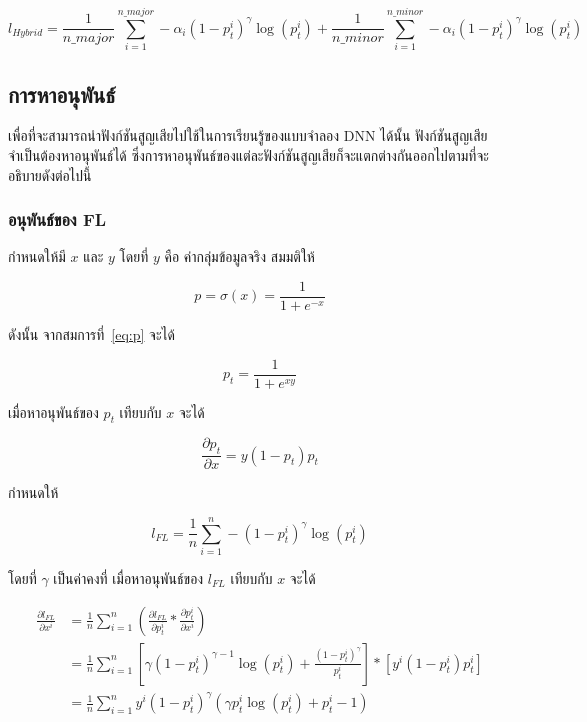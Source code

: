 \begin{equation} \label{eq:hybird1}
    l_{Hybrid} = \frac{1}{n\_major} \sum_{i = 1}^{n\_major} -\alpha_{i}(1 - p_{t}^{i})^{\gamma}\log (p_{t}^{i}) + \frac{1}{n\_minor} \sum_{i = 1}^{n\_minor} -\alpha_{i}(1 - p_{t}^{i})^{\gamma}\log (p_{t}^{i})
\end{equation}

\subsection{การหาอนุพันธ์}
เพื่อที่จะสามารถนำฟังก์ชันสูญเสียไปใช้ในการเรียนรู้ของแบบจำลอง DNN ได้นั้น ฟังก์ชันสูญเสียจำเป็นต้องหาอนุพันธ์ได้ ซึ่งการหาอนุพันธ์ของแต่ละฟังก์ชันสูญเสียก็จะแตกต่างกันออกไปตามที่จะอธิบายดังต่อไปนี้

\subsubsection{อนุพันธ์ของ FL}
กำหนดให้มี $x$ และ $y$ โดยที่ $y$ คือ ค่ากลุ่มข้อมูลจริง สมมติให้

\begin{equation}
	p = \sigma (x) = \frac{1}{1 + e^{-x}}
\end{equation}

ดังนั้น จากสมการที่~\ref{eq:p} จะได้

\begin{equation}
	p_{t} = \frac{1}{1 + e^{xy}}
\end{equation}

เมื่อหาอนุพันธ์ของ $p_{t}$ เทียบกับ $x$ จะได้

\begin{equation}
\frac{\partial p_{t}}{\partial x} = y(1 - p_{t})p_{t}
\end{equation}

กำหนดให้

\begin{equation}
    l_{FL} = \frac{1}{n} \sum_{i = 1}^{n} - (1 - p_{t}^{i})^{\gamma}\log (p_{t}^{i})
\end{equation}

โดยที่ $\gamma$ เป็นค่าคงที่ เมื่อหาอนุพันธ์ของ $l_{FL}$ เทียบกับ $x$ จะได้

\begin{equation}
\begin{split}
\frac{\partial l_{FL}}{\partial x^{i}} & = \frac{1}{n} \sum_{i = 1}^{n} (\frac{\partial l_{FL}}{\partial p_{t}^{i}} * \frac{\partial p_{t}^{i}}{\partial x^{i}}) \\
& =\frac{1}{n} \sum_{i = 1}^{n} [\gamma (1 - p_{t}^{i})^{\gamma - 1} \log (p_{t}^{i}) + \frac{(1 - p_{t}^{i})^{\gamma}}{p_{t}^{i}}] * [y^{i}(1 - p_{t}^{i})p_{t}^{i}]  \\
& = \frac{1}{n} \sum_{i = 1}^{n} y^{i} (1 - p_{t}^{i})^{\gamma} (\gamma p_{t}^{i} \log (p_{t}^{i}) + p_{t}^{i} - 1)
\end{split}
\end{equation}

